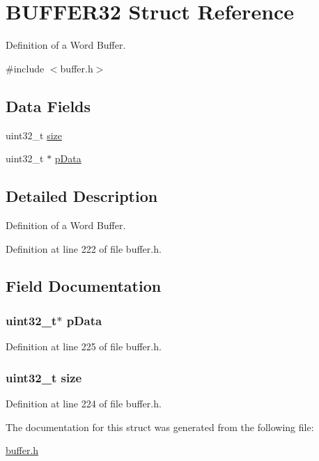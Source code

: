 \hypertarget{a00004}{
\section{BUFFER32 Struct Reference}
\label{a00004}
}


Definition of a Word Buffer.  




{\ttfamily \#include $<$buffer.h$>$}

\subsection*{Data Fields}
\begin{DoxyCompactItemize}
\item 
uint32\_\-t \hyperlink{a00004_ab2c6b258f02add8fdf4cfc7c371dd772}{size}
\item 
uint32\_\-t $\ast$ \hyperlink{a00004_a2eaf2582580fd48c0dac78bcc17e6cdf}{pData}
\end{DoxyCompactItemize}


\subsection{Detailed Description}
Definition of a Word Buffer. 

Definition at line 222 of file buffer.h.



\subsection{Field Documentation}
\hypertarget{a00004_a2eaf2582580fd48c0dac78bcc17e6cdf}{
\subsubsection[{pData}]{\setlength{\rightskip}{0pt plus 5cm}uint32\_\-t$\ast$ {\bf pData}}}
\label{a00004_a2eaf2582580fd48c0dac78bcc17e6cdf}


Definition at line 225 of file buffer.h.

\hypertarget{a00004_ab2c6b258f02add8fdf4cfc7c371dd772}{
\subsubsection[{size}]{\setlength{\rightskip}{0pt plus 5cm}uint32\_\-t {\bf size}}}
\label{a00004_ab2c6b258f02add8fdf4cfc7c371dd772}


Definition at line 224 of file buffer.h.



The documentation for this struct was generated from the following file:\begin{DoxyCompactItemize}
\item 
\hyperlink{a00465}{buffer.h}\end{DoxyCompactItemize}
